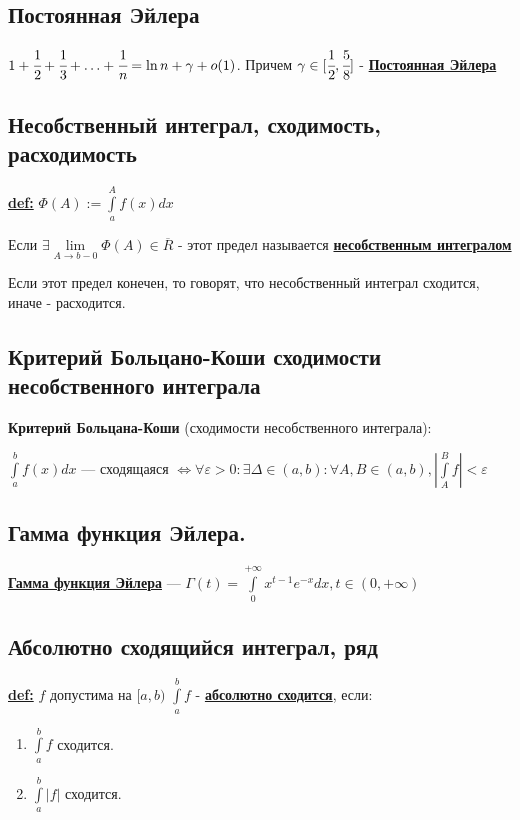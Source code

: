 \documentclass{article}
\newcommand{\integral}[2]{\displaystyle\int\limits_{#1}^{#2}}
\newcommand{\deff}[1]{\underline{\textbf{#1}}}
\begin{document}
\subsection{Постоянная Эйлера}

$1+\cfrac{1}{2}+\cfrac{1}{3}+\ldots +\cfrac{1}{n}= \ln n + \gamma + o(1)$. Причем $\gamma \in [\cfrac{1}{2},\cfrac{5}{8}]$ - \deff{Постоянная Эйлера}

\subsection{Несобственный интеграл, сходимость, расходимость}

\deff{def:} $\varPhi(A):= \integral{a}{A}f(x) dx$

Если $\exists \lim\limits_{A \rightarrow b -0} \varPhi(A) \in \overline{R}$ - этот предел называется \deff{несобственным интегралом}

Если этот предел конечен, то говорят, что несобственный интеграл сходится, иначе - расходится.

\subsection{Критерий Больцано-Коши сходимости несобственного интеграла}

\textbf{Критерий Больцана-Коши} (сходимости несобственного интеграла):
  
  $\integral{a}{b}f(x)dx$ --- сходящаяся $\Leftrightarrow \forall \varepsilon >0:\exists \Delta \in (a,b): \forall A,B\in (a,b),  |\integral{A}{B}f|< \varepsilon$
  
\subsection{Гамма функция Эйлера.}

\deff{Гамма функция Эйлера} --- $\Gamma(t) = \integral{0}{+\infty}x^{t-1}e^{-x} dx, t \in (0,+\infty)$

\subsection{Абсолютно сходящийся интеграл, ряд}

\deff{def:} $f$ допустима на $[a,b)$
$\integral{a}{b}f$ - \deff{абсолютно сходится}, если:
\begin{enumerate}
    \item $\integral{a}{b}f$ сходится.
    \item $\integral{a}{b} |f|$ сходится.
\end{enumerate}
\end{document}
